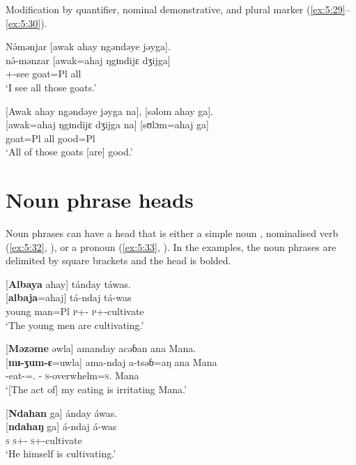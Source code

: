 Modification by quantifier, nominal demonstrative, and plural marker (\ref{ex:5:29}--\ref{ex:5:30}). 

\ea \label{ex:5:29}
N\'{ə}mənjar  [awak  ahay  ngəndəye  jəyga].\\
\gll  n\'{ə}-mənzar  [awak=ahaj  ŋgɪndijɛ   dʒijga]\\
      {\oneS}+{\IFV}-see  goat=Pl  {\DEM}  all\\
\glt  ‘I see all those goats.’
\z

\ea \label{ex:5:30}
{}[Awak  ahay  ngəndəye  jəyga  na],  [səlom  ahay  ga].\\
\gll  {}[awak=ahaj   ŋgɪndijɛ   dʒijga   na]   [sʊlɔm=ahaj   ga]\\
      goat=Pl  {\DEM}  all  {\PSP}  good=Pl  {\ADJ}\\
\glt  ‘All of those goats [are] good.’
\z

\section{Noun phrase heads}\label{sec:5.2}
\hypertarget{RefHeading1211601525720847}{}
Noun phrases can have a head that is either a simple noun , nominalised verb (\ref{ex:5:32}, ), or a pronoun (\ref{ex:5:33}, ). In the examples, the noun phrases are delimited by square brackets and the head is bolded. 

\clearpage
\ea \label{ex:5:31}
{}[\textbf{Albaya}  ahay]  tánday  táwas.\\
\gll  {}[\textbf{albaja}=ahaj]    tá-ndaj    tá-was\\
      {young man}=Pl    \textsc{p}+{\IFV}-{\PROG}  \textsc{p}+{\IFV}-cultivate\\
\glt  ‘The young men are cultivating.’ 
\z

\ea \label{ex:5:32}
{}[\textbf{Məzəme}  əwla]  amanday  acəɓan  ana  Mana.\\
\gll  {}[\textbf{mɪ-ʒum-ɛ}=uwla]    ama-ndaj  a-tsəɓ=aŋ    ana   Mana\\
      {\NOM}{}-eat-{\CL}={\oneS}.{\POSS}  {\DEP}-{\PROG}  \textsc{s}-overwhelm=\textsc{s}.{\IO}  {\DAT} Mana\\
\glt  ‘[The act of] my eating is irritating Mana.’
\z

\ea \label{ex:5:33}
{}[\textbf{Ndahan} ga]  ánday  áwas.\\
\gll  {}[\textbf{ndahaŋ}  ga]   á-ndaj  á-was\\
      \textsc{s}    {\ADJ}  \textsc{s}+{\IFV}-{\PROG}  \textsc{s}+{\IFV}-cultivate\\
\glt  ‘He himself is cultivating.’
\z

